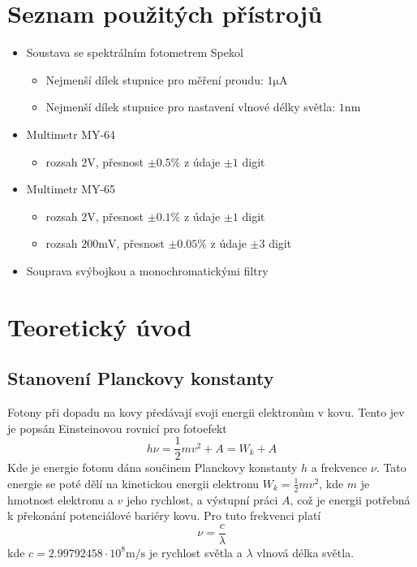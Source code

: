 \documentclass[titlepage]{article}
\begin{document}
\section{Seznam použitých přístrojů}
\begin{itemize}
 \item Soustava se spektrálním fotometrem Spekol
 \begin{itemize}
  \item Nejmenší dílek stupnice pro měření proudu: $1 \si{\micro\ampere}$
  \item Nejmenší dílek stupnice pro nastavení vlnové délky světla: $1 \si{\nano\meter}$
 \end{itemize}

 \item Multimetr MY-64
 \begin{itemize}
  \item rozsah $2 \si{\volt}$, přesnost $\pm 0.5 \%$ z údaje $\pm 1$ digit
 \end{itemize}


 \item Multimetr MY-65
 \begin{itemize}
  \item rozsah $2 \si{\volt}$, přesnost $\pm 0.1 \%$ z údaje $\pm 1$ digit
  \item rozsah $200 \si{\milli\volt}$, přesnost $\pm 0.05 \%$ z údaje $\pm 3$ digit
 \end{itemize}

 \item Souprava svýbojkou a monochromatickými filtry
\end{itemize}

\section{Teoretický úvod}
\subsection{Stanovení Planckovy konstanty}
Fotony při dopadu na kovy předávají svoji energii elektronům v kovu. Tento jev je popsán Einsteinovou rovnicí pro fotoefekt
\begin{equation}\label{eq:einstein}
 h\nu = \frac{1}{2}mv^2 + A = W_k + A
\end{equation}
Kde je energie fotonu dána součinem Planckovy konstanty $h$ a frekvence $\nu$. Tato energie se poté dělí na kinetickou energii elektronu $W_k = \frac{1}{2}mv^2$, kde $m$ je hmotnost elektronu a $v$ jeho rychlost, a výstupní práci $A$, což je energii potřebná k překonání potenciálové bariéry kovu. Pro tuto frekvenci platí
\begin{equation}
 \nu = \frac{c}{\lambda}\label{eq:frequency}
\end{equation}
kde $c = 2.99792458 \cdot 10^8 \si{\meter\per\second}$ je rychlost světla a $\lambda$ vlnová délka světla.
\end{document}
